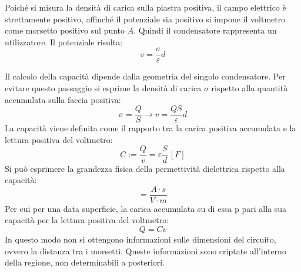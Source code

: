 \documentclass{article}
\numberwithin{equation}{subsection}
\begin{document}
Poiché si misura la densità di carica sulla piastra positiva, il campo elettrico è strettamente positivo, affinché il potenziale sia positivo si impone il voltmetro come 
morsetto positivo sul punto $A$. Quindi il condensatore rappresenta un utilizzatore. Il potenziale risulta:
\begin{equation*}
    v=\displaystyle\frac{\sigma}{\varepsilon}d
\end{equation*}

Il calcolo della capacità dipende dalla geometria del singolo condensatore. Per evitare questo passaggio si esprime la densità di carica $\sigma$ rispetto alla quantità 
accumulata sulla faccia positiva:
\begin{equation*}
    \sigma=\displaystyle\frac{Q}{S}\to v=\frac{QS}{\varepsilon}d
\end{equation*}
La capacità viene definita come il rapporto tra la carica positiva accumulata e la lettura positiva del voltmetro:
\begin{equation}
    C:=\displaystyle\frac{Q}{v}=\varepsilon\frac{S}{d}\,[F]
\end{equation}
Si può esprimere la grandezza fisica della permettività dielettrica rispetto alla capacità:
\begin{equation*}
    [\varepsilon]=\displaystyle\frac{A\cdot s}{V\cdot m}
\end{equation*} 
Per cui per una data superficie, la carica accumulata su di essa p pari alla sua capacità per la lettura positiva del voltmetro:
\begin{equation*}
    Q=Cv
\end{equation*}
In questo modo non si ottengono informazioni sulle dimensioni del circuito, ovvero la distanza tra i morsetti. Queste informazioni sono criptate all'interno della regione, 
non determinabili a posteriori. 
\end{document}
